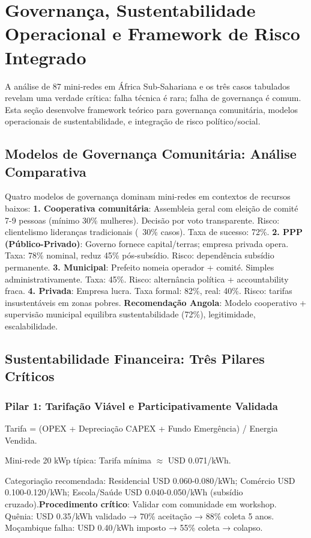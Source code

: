 \documentclass[12pt, a4paper]{article}
\begin{document}
\section{Governança, Sustentabilidade Operacional e Framework de Risco Integrado}

A análise de 87 mini-redes em África Sub-Sahariana e os três casos tabulados revelam uma verdade crítica: falha técnica é rara; falha de governança é comum. Esta seção desenvolve framework teórico para governança comunitária, modelos operacionais de sustentabilidade, e integração de risco político/social.

\subsection{Modelos de Governança Comunitária: Análise Comparativa}

Quatro modelos de governança dominam mini-redes em contextos de recursos baixos:
\textbf{1. Cooperativa comunitária}: Assembleia geral com eleição de comité 7-9 pessoas (mínimo 30\% mulheres). Decisão por voto transparente. Risco: clientelismo lideranças tradicionais (~30\% casos). Taxa de sucesso: 72\%.
\textbf{2. PPP (Público-Privado)}: Governo fornece capital/terras; empresa privada opera. Taxa: 78\% nominal, reduz 45\% pós-subsídio. Risco: dependência subsídio permanente.
\textbf{3. Municipal}: Prefeito nomeia operador + comité. Simples administrativamente. Taxa: 45\%. Risco: alternância política + accountability fraca.
\textbf{4. Privada}: Empresa lucra. Taxa formal: 82\%, real: 40\%. Risco: tarifas insustentáveis em zonas pobres.
\textbf{Recomendação Angola}: Modelo cooperativo + supervisão municipal equilibra sustentabilidade (72\%), legitimidade, escalabilidade.

\subsection{Sustentabilidade Financeira: Três Pilares Críticos}

\subsubsection{Pilar 1: Tarifação Viável e Participativamente Validada}

Tarifa = (OPEX + Depreciação CAPEX + Fundo Emergência) / Energia Vendida.

Mini-rede 20 kWp típica: Tarifa mínima $\approx$ USD 0.071/kWh.

Categoriação recomendada: Residencial USD 0.060-0.080/kWh; Comércio USD 0.100-0.120/kWh; Escola/Saúde USD 0.040-0.050/kWh (subsídio cruzado).\textbf{Procedimento crítico}: Validar com comunidade em workshop. Quênia: USD 0.35/kWh validado → 70\% aceitação → 88\% coleta 5 anos. Moçambique falha: USD 0.40/kWh imposto → 55\% coleta → colapso.
\end{document}

